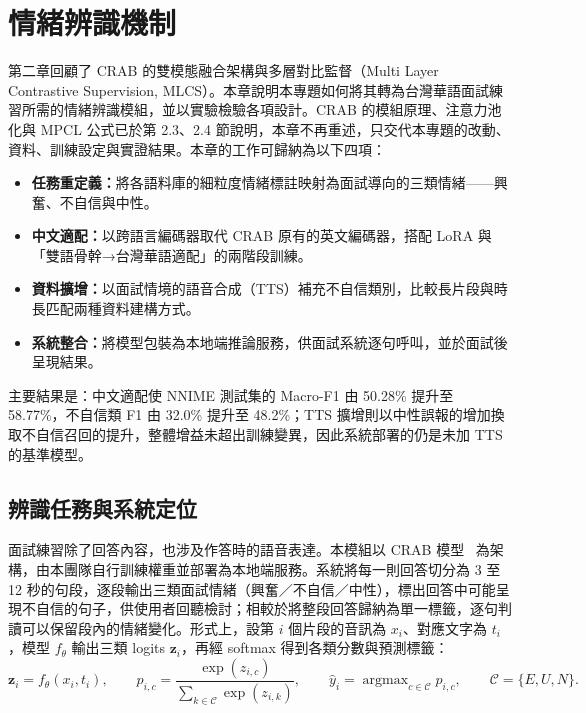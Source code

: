 \chapter{情緒辨識機制}
\label{chap:emotion}

第二章回顧了 CRAB 的雙模態融合架構與多層對比監督（Multi Layer Contrastive Supervision, MLCS）。本章說明本專題如何將其轉為台灣華語面試練習所需的情緒辨識模組，並以實驗檢驗各項設計。CRAB 的模組原理、注意力池化與 MPCL 公式已於第 2.3、2.4 節說明，本章不再重述，只交代本專題的改動、資料、訓練設定與實證結果。本章的工作可歸納為以下四項：

\begin{itemize}
  \item \textbf{任務重定義：}將各語料庫的細粒度情緒標註映射為面試導向的三類情緒——興奮、不自信與中性。
  \item \textbf{中文適配：}以跨語言編碼器取代 CRAB 原有的英文編碼器，搭配 LoRA 與「雙語骨幹→台灣華語適配」的兩階段訓練。
  \item \textbf{資料擴增：}以面試情境的語音合成（TTS）補充不自信類別，比較長片段與時長匹配兩種資料建構方式。
  \item \textbf{系統整合：}將模型包裝為本地端推論服務，供面試系統逐句呼叫，並於面試後呈現結果。
\end{itemize}

主要結果是：中文適配使 NNIME 測試集的 Macro-F1 由 50.28\% 提升至 58.77\%，不自信類 F1 由 32.0\% 提升至 48.2\%；TTS 擴增則以中性誤報的增加換取不自信召回的提升，整體增益未超出訓練變異，因此系統部署的仍是未加 TTS 的基準模型。

\section{辨識任務與系統定位}
\label{sec:task}

面試練習除了回答內容，也涉及作答時的語音表達。本模組以 CRAB 模型~\cite{crab} 為架構，由本團隊自行訓練權重並部署為本地端服務。系統將每一則回答切分為 3 至 12 秒的句段，逐段輸出三類面試情緒（興奮／不自信／中性），標出回答中可能呈現不自信的句子，供使用者回聽檢討；相較於將整段回答歸納為單一標籤，逐句判讀可以保留段內的情緒變化。形式上，設第 $i$ 個片段的音訊為 $x_i$、對應文字為 $t_i$，模型 $f_\theta$ 輸出三類 logits $\boldsymbol z_i$，再經 softmax 得到各類分數與預測標籤：
\begin{equation}
 \boldsymbol z_i=f_\theta(x_i,t_i),\qquad
 p_{i,c}=\frac{\exp(z_{i,c})}{\sum_{k\in\mathcal C}\exp(z_{i,k})},\qquad
 \hat y_i=\mathop{\arg\max}_{c\in\mathcal C}p_{i,c},\qquad
 \mathcal C=\{E,U,N\}.
 \label{eq:prediction}
\end{equation}

